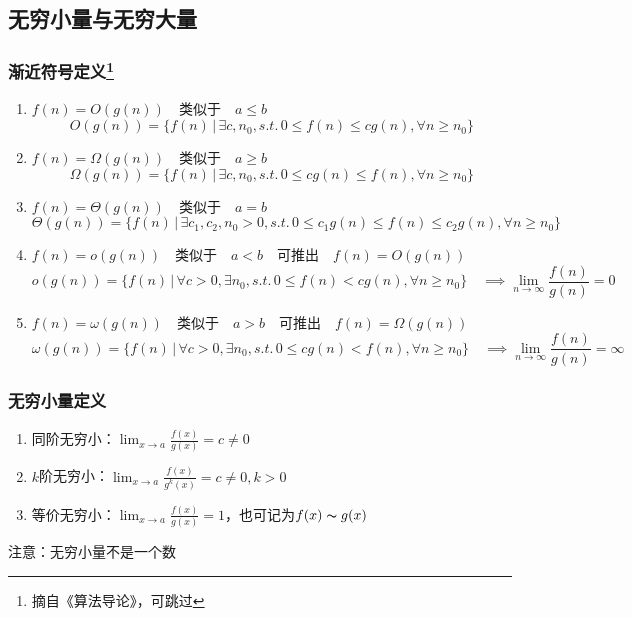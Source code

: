 \subsection{无穷小量与无穷大量}
\subsubsection{渐近符号定义\protect\footnote{摘自《算法导论》，可跳过}}
\begin{enumerate}
	\item $f(n)=O(g(n))\quad$类似于$\quad a\leq b$
	\[O(g(n))=\{f(n)\,|\,\exists c,n_0,s.t.\,0\leq f(n)\leq cg(n),\forall n\geq n_0\}\]
	\item $f(n)=\Omega(g(n))\quad$类似于$\quad a\geq b$
	\[\Omega(g(n))=\{f(n)\,|\,\exists c,n_0,s.t.\,0\leq cg(n)\leq f(n),\forall n\geq n_0\}\]
	\item $f(n)=\Theta(g(n))\quad$类似于$\quad a=b$
	\[\Theta(g(n))=\{f(n)\,|\,\exists c_1,c_2,n_0>0,s.t.\,0\leq c_1g(n)\leq f(n)\leq c_2g(n),\forall n\geq n_0\}\]
	\item $f(n)=o(g(n))\quad$类似于$\quad a<b\quad$可推出$\quad f(n)=O(g(n))$
	\[o(g(n))=\{f(n)\,|\,\forall c>0,\exists n_0,s.t.\,0\leq f(n)< cg(n),\forall n\geq n_0\}\quad\implies\lim_{n\to\infty}\frac{f(n)}{g(n)}=0\]
	\item $f(n)=\omega(g(n))\quad$类似于$\quad a>b\quad$可推出$\quad f(n)=\Omega(g(n))$
	\[\omega(g(n))=\{f(n)\,|\,\forall c>0,\exists n_0,s.t.\,0\leq cg(n)< f(n),\forall n\geq n_0\}\quad\implies\lim_{n\to\infty}\frac{f(n)}{g(n)}=\infty\]
\end{enumerate}

\subsubsection{无穷小量定义}
\begin{enumerate}
	\item 同阶无穷小：$\displaystyle\lim_{x\to a}\frac{f(x)}{g(x)}=c\ne 0$
	\item $k$阶无穷小：$\displaystyle\lim_{x\to a}\frac{f(x)}{g^k(x)}=c\ne 0,k>0$
	\item 等价无穷小：$\displaystyle\lim_{x\to a}\frac{f(x)}{g(x)}=1$，也可记为$f(x)\thicksim g(x)$
\end{enumerate}
注意：无穷小量不是一个数

